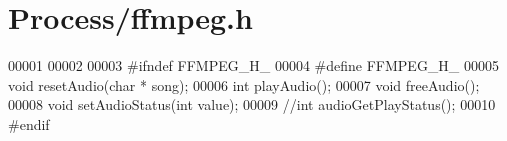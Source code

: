 \hypertarget{ffmpeg_8h_source}{\section{\-Process/ffmpeg.h}
}

\begin{DoxyCode}
00001 
00002 
00003 \textcolor{preprocessor}{#ifndef FFMPEG\_H\_}
00004 \textcolor{preprocessor}{}\textcolor{preprocessor}{#define FFMPEG\_H\_}
00005 \textcolor{preprocessor}{}\textcolor{keywordtype}{void} resetAudio(\textcolor{keywordtype}{char} * song);
00006 \textcolor{keywordtype}{int} playAudio();
00007 \textcolor{keywordtype}{void} freeAudio();
00008 \textcolor{keywordtype}{void} setAudioStatus(\textcolor{keywordtype}{int} value);
00009 \textcolor{comment}{//int audioGetPlayStatus();}
00010 \textcolor{preprocessor}{#endif}
\end{DoxyCode}
